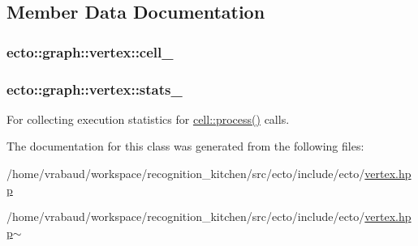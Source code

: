 \subsection{Member Data Documentation}
\hypertarget{classecto_1_1graph_1_1vertex_a14485eadc4288f5d4e5e32e6b5218ec7}{
\subsubsection[{cell\-\_\-}]{ ecto\-::graph\-::vertex\-::cell\-\_\-\hspace{0.3cm}{\ttfamily [private]}}}\label{classecto_1_1graph_1_1vertex_a14485eadc4288f5d4e5e32e6b5218ec7}
\hypertarget{classecto_1_1graph_1_1vertex_abf79016904200297ba32e42534c8ac53}{
\subsubsection[{stats\-\_\-}]{ ecto\-::graph\-::vertex\-::stats\-\_\-\hspace{0.3cm}{\ttfamily [private]}}}\label{classecto_1_1graph_1_1vertex_abf79016904200297ba32e42534c8ac53}


For collecting execution statistics for \hyperlink{structecto_1_1cell_a6b810671ee21f5dddbc1206abfb999f3}{cell\-::process()} calls. 



The documentation for this class was generated from the following files\-:\begin{DoxyCompactItemize}
\item 
/home/vrabaud/workspace/recognition\-\_\-kitchen/src/ecto/include/ecto/\hyperlink{vertex_8hpp}{vertex.\-hpp}\item 
/home/vrabaud/workspace/recognition\-\_\-kitchen/src/ecto/include/ecto/\hyperlink{vertex_8hpp~}{vertex.\-hpp$\sim$}\end{DoxyCompactItemize}
